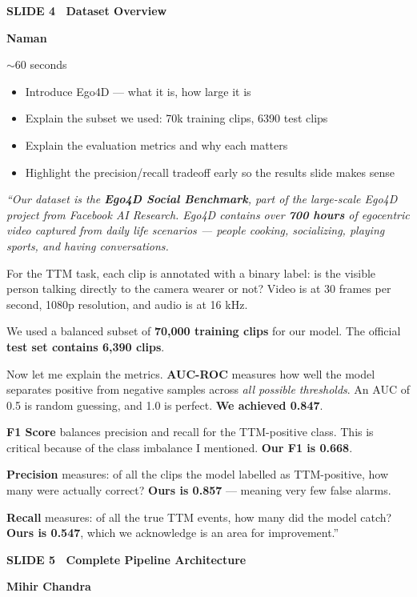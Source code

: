 \documentclass[11pt, a4paper]{article}
\newcommand{\slideheading}[3]{%
  \vspace{0.6cm}
  \begin{tcolorbox}[slidebox]
    \textbf{\color{NavyBlue}SLIDE #1 \textemdash\ #2}\\[2pt]
    \begin{tcolorbox}[presenterbox, title=Presenter(s)]
      \color{AccBlue}\bfseries #3
    \end{tcolorbox}
  \end{tcolorbox}
}
\newcommand{\timing}[1]{%
  \begin{tcolorbox}[timebox, title=Suggested Time]
    \color{AccOrange} #1
  \end{tcolorbox}
}
\newcommand{\keypoints}[1]{%
  \begin{tcolorbox}[keybox, title=Key Points to Cover]
    #1
  \end{tcolorbox}
}
\newcommand{\script}[1]{%
  \begin{mdframed}[
    backgroundcolor=white,
    linecolor=MidText!40,
    linewidth=0.5pt,
    leftmargin=0pt,
    rightmargin=0pt,
    innerleftmargin=10pt,
    innerrightmargin=8pt,
    innertopmargin=8pt,
    innerbottommargin=8pt,
    roundcorner=3pt
  ]
  \itshape\color{MidText}
  #1
  \end{mdframed}
}
\begin{document}
\slideheading{4}{Dataset Overview}{Naman}

\timing{$\sim$60 seconds}

\keypoints{%
\begin{itemize}[leftmargin=*, itemsep=2pt]
  \item Introduce Ego4D --- what it is, how large it is
  \item Explain the subset we used: 70k training clips, 6390 test clips
  \item Explain the evaluation metrics and why each matters
  \item Highlight the precision/recall tradeoff early so the results slide makes sense
\end{itemize}
}

\script{%
``Our dataset is the \textbf{Ego4D Social Benchmark}, part of the large-scale Ego4D project from Facebook AI Research. Ego4D contains over \textbf{700 hours} of egocentric video captured from daily life scenarios --- people cooking, socializing, playing sports, and having conversations.

For the TTM task, each clip is annotated with a binary label: is the visible person talking directly to the camera wearer or not? Video is at 30 frames per second, 1080p resolution, and audio is at 16 kHz.

We used a balanced subset of \textbf{70,000 training clips} for our model. The official \textbf{test set contains 6,390 clips}.

Now let me explain the metrics. \textbf{AUC-ROC} measures how well the model separates positive from negative samples across \textit{all possible thresholds}. An AUC of 0.5 is random guessing, and 1.0 is perfect. \textbf{We achieved 0.847}.

\textbf{F1 Score} balances precision and recall for the TTM-positive class. This is critical because of the class imbalance I mentioned. \textbf{Our F1 is 0.668}.

\textbf{Precision} measures: of all the clips the model labelled as TTM-positive, how many were actually correct? \textbf{Ours is 0.857} --- meaning very few false alarms.

\textbf{Recall} measures: of all the true TTM events, how many did the model catch? \textbf{Ours is 0.547}, which we acknowledge is an area for improvement.''
}

\slideheading{5}{Complete Pipeline Architecture}{Mihir Chandra}
\end{document}
